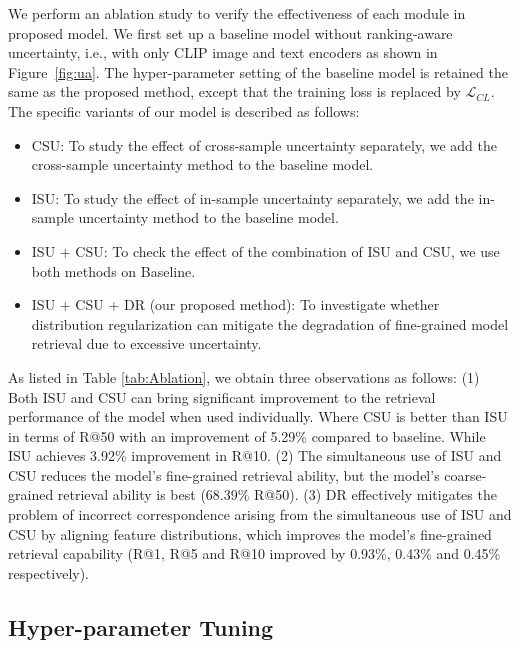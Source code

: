 \documentclass[letterpaper]{article} \usepackage{aaai24}  \usepackage{times}  \usepackage{helvet}  \usepackage{courier}  \usepackage[hyphens]{url}  \usepackage{graphicx} \urlstyle{rm} \def\UrlFont{\rm}  \usepackage{natbib}  \usepackage{caption} \frenchspacing  \setlength{\pdfpagewidth}{8.5in} \setlength{\pdfpageheight}{11in} \usepackage{amsmath,amsfonts}
\begin{document}
We perform an ablation study to verify the effectiveness of each module in proposed model. We first set up a baseline model without ranking-aware uncertainty, i.e., with only CLIP image and text encoders as shown in Figure~\ref{fig:ua}. The hyper-parameter setting of the baseline model is retained the same as the proposed method, except that the training loss is replaced by $\mathcal{L}_{CL}$. The specific variants of our
model is described as follows:
\begin{itemize}
    \item  CSU: To study the effect of cross-sample uncertainty separately, we add the cross-sample uncertainty method to the baseline model.
    \item ISU: To study the effect of in-sample uncertainty separately, we add the in-sample uncertainty method to the baseline model.
    \item  ISU $+$ CSU: To check the effect of the combination of ISU and CSU, we use both methods on Baseline.
    \item ISU $+$ CSU + DR (our proposed method): To investigate whether distribution regularization can mitigate the degradation of fine-grained model retrieval due to excessive uncertainty.
\end{itemize}

As listed in Table \ref{tab:Ablation}, we obtain three observations as follows: (1) Both ISU and CSU can bring significant improvement to the retrieval performance of the model when used individually. Where CSU is better than ISU in terms of R@50 with an improvement of 5.29\% compared to baseline. While ISU achieves 3.92\% improvement in R@10. (2) The simultaneous use of ISU and CSU reduces the model's fine-grained retrieval ability, but the model's coarse-grained retrieval ability is best (68.39\% R@50). (3) DR effectively mitigates the problem of incorrect correspondence arising from the simultaneous use of ISU and CSU by aligning feature distributions, which improves the model's fine-grained retrieval capability (R@1, R@5 and R@10 improved by 0.93\%, 0.43\% and 0.45\% respectively).


\subsection{Hyper-parameter Tuning}
\end{document}
